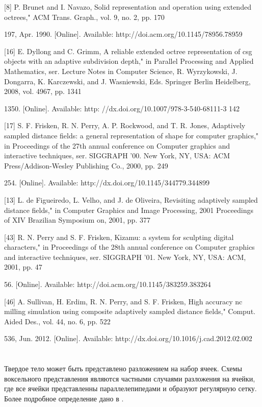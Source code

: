 [8] P. Brunet and I. Navazo, Solid representation and operation using extended
octrees," ACM Trans. Graph., vol. 9, no. 2, pp. 170{197, Apr. 1990. [Online].
Available: http://doi.acm.org/10.1145/78956.78959

[16] E. Dyllong and C. Grimm, A reliable extended octree representation of
csg objects with an adaptive subdivision depth," in Parallel Processing and
Applied Mathematics, ser. Lecture Notes in Computer Science, R. Wyrzykowski,
J. Dongarra, K. Karczewski, and J. Wasniewski, Eds. Springer Berlin
Heidelberg, 2008, vol. 4967, pp. 1341{1350. [Online]. Available: http:
//dx.doi.org/10.1007/978-3-540-68111-3 142

[17] S. F. Frisken, R. N. Perry, A. P. Rockwood, and T. R. Jones, Adaptively
sampled distance fields: a general representation of shape for computer
graphics," in Proceedings of the 27th annual conference on Computer graphics
and interactive techniques, ser. SIGGRAPH ’00. New York, NY, USA: ACM
Press/Addison-Wesley Publishing Co., 2000, pp. 249{254. [Online]. Available:
http://dx.doi.org/10.1145/344779.344899

[13] L. de Figueiredo, L. Velho, and J. de Oliveira, Revisiting adaptively sampled
distance fields," in Computer Graphics and Image Processing, 2001 Proceedings
of XIV Brazilian Symposium on, 2001, pp. 377

[43] R. N. Perry and S. F. Frisken, Kizamu: a system for sculpting digital
characters," in Proceedings of the 28th annual conference on Computer graphics
and interactive techniques, ser. SIGGRAPH ’01. New York, NY, USA: ACM,
2001, pp. 47{56. [Online]. Available: http://doi.acm.org/10.1145/383259.383264

[46] A. Sullivan, H. Erdim, R. N. Perry, and S. F. Frisken, High accuracy
nc milling simulation using composite adaptively sampled distance fields,"
Comput. Aided Des., vol. 44, no. 6, pp. 522{536, Jun. 2012. [Online]. Available:
http://dx.doi.org/10.1016/j.cad.2012.02.002


\section{} \label{sect_cell_decompositions}

Твердое тело может быть представлено разложением на набор ячеек. Схемы воксельного представления являются частными случаями разложения на ячейки, где все ячейки представленны параллелепипедами и образуют регулярную сетку. Более подробное определение дано в \cite{Requicha80}.

}}}}}
